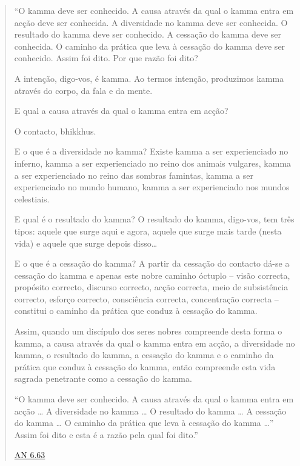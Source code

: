 \clearpage

\begin{quote}

  ``O kamma deve ser conhecido. A causa através da qual o kamma entra em acção
  deve ser conhecida. A diversidade no kamma deve ser conhecida. O resultado do
  kamma deve ser conhecido. A cessação do kamma deve ser conhecida. O caminho da
  prática que leva à cessação do kamma deve ser conhecido. Assim foi dito. Por
  que razão foi dito?

  A intenção, digo-vos, é kamma. Ao termos intenção, produzimos kamma através do
  corpo, da fala e da mente.

  E qual a causa através da qual o kamma entra em acção?

  O contacto, bhikkhus.

  E o que é a diversidade no kamma? Existe kamma a ser experienciado no inferno,
  kamma a ser experienciado no reino dos animais vulgares, kamma a ser
  experienciado no reino das sombras famintas, kamma a ser experienciado no
  mundo humano, kamma a ser experienciado nos mundos celestiais.

  E qual é o resultado do kamma? O resultado do kamma, digo-vos, tem três tipos:
  aquele que surge aqui e agora, aquele que surge mais tarde (nesta vida) e
  aquele que surge depois disso\ldots{}

  E o que é a cessação do kamma? A partir da cessação do contacto dá-se a
  cessação do kamma e apenas este nobre caminho óctuplo -- visão correcta,
  propósito correcto, discurso correcto, acção correcta, meio de subsistência
  correcto, esforço correcto, consciência correcta, concentração correcta --
  constitui o caminho da prática que conduz à cessação do kamma.

  Assim, quando um discípulo dos seres nobres compreende desta forma o kamma, a
  causa através da qual o kamma entra em acção, a diversidade no kamma, o
  resultado do kamma, a cessação do kamma e o caminho da prática que conduz à
  cessação do kamma, então compreende esta vida sagrada penetrante como a
  cessação do kamma.

  ``O kamma deve ser conhecido. A causa através da qual o kamma entra em acção
  \ldots{} A diversidade no kamma \ldots{} O resultado do kamma \ldots{} A
  cessação do kamma \ldots{} O caminho da prática que leva à cessação do kamma
  \ldots{}'' Assim foi dito e esta é a razão pela qual foi dito.''

  \href{https://suttacentral.net/an6.63/en/thanissaro}{AN 6.63}

\end{quote}
